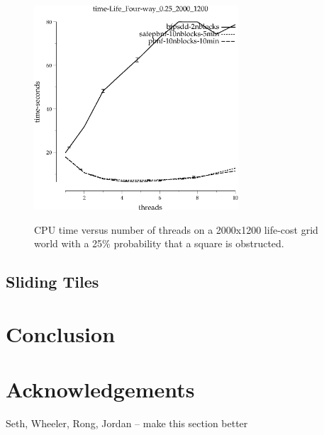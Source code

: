 \documentclass{article}
\begin{document}
\begin{figure}[t]
\includegraphics[width=3in]{../graphs/grid_life_four-way_0.25_2000_1200/time-Life_Four-way_0.25_2000_1200.eps}
\label{fig:grid-life}
\caption{CPU time versus number of threads on a 2000x1200 life-cost
  grid world with a 25\% probability that a square is obstructed.}
\end{figure}

\subsection{Sliding Tiles}

\section{Conclusion}
\section{Acknowledgements}

Seth, Wheeler, Rong, Jordan -- make this section better



\end{document}
